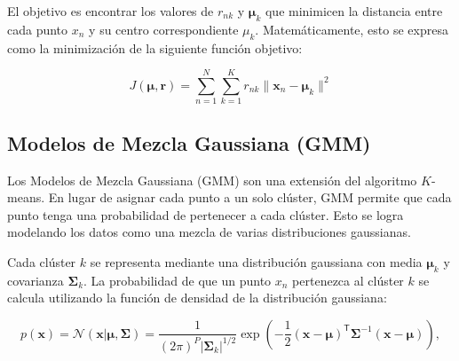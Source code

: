 El objetivo es encontrar los valores de \(r_{nk}\) y \(\boldsymbol{\mu}_{k}\) que minimicen la distancia entre cada punto \(x_{n}\) y su centro correspondiente \(\mu_{k}\). Matemáticamente, esto se expresa como la minimización de la siguiente función objetivo:

\[
J(\boldsymbol{\mu},\boldsymbol{r}) = \sum_{n=1}^{N} \sum_{k=1}^{K} r_{nk} \| \boldsymbol{x}_n - \boldsymbol{\mu}_k \|^2
\]


\subsection{Modelos de Mezcla Gaussiana (GMM)}

Los Modelos de Mezcla Gaussiana (GMM) son una extensión del algoritmo \(K\)-means. En lugar de asignar cada punto a un solo clúster, GMM permite que cada punto tenga una probabilidad de pertenecer a cada clúster. Esto se logra modelando los datos como una mezcla de varias distribuciones gaussianas.

Cada clúster \(k\) se representa mediante una distribución gaussiana con media \(\boldsymbol{\mu}_k\) y covarianza \(\boldsymbol{\Sigma}_k\). La probabilidad de que un punto \(x_n\) pertenezca al clúster \(k\) se calcula utilizando la función de densidad de la distribución gaussiana:

\[
p(\boldsymbol{x}) = \mathcal{N}(\boldsymbol{x} | \boldsymbol{\mu}, \boldsymbol{\Sigma}
)=\frac{1}{(2\pi)^{P} |\boldsymbol{\Sigma}_k|^{1/2}} \exp\left(-\frac{1}{2} (\boldsymbol{x} - \boldsymbol{\mu})^\mathsf{T} \boldsymbol{\Sigma}^{-1} (\boldsymbol{x} - \boldsymbol{\mu})\right),
\]



